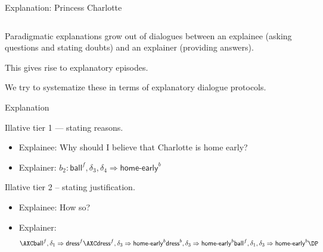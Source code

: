 \documentclass[aspectratio=169]{beamer}
\begin{document}
\begin{frame}[label={sec:org36535bb},fragile]{Explanation: Princess Charlotte}
\begin{columns}
\begin{column}{.6\columnwidth}
\begin{center}
\end{center}
\end{column}
\end{columns}
\end{frame}
\begin{frame}[label={sec:org540a8bb},standout]{}
Paradigmatic explanations grow out of dialogues between an \alert{explainee} (asking questions and stating doubts) and an \alert{explainer} (providing answers). \pause

This gives rise to \alert{explanatory episodes}. \pause

We try to systematize these in terms of \alert{explanatory dialogue protocols}. 
\end{frame}

\begin{frame}[label={sec:orgf702943}]{Explanation}
\begin{bbox}
\alert{Illative tier 1} --- stating reasons.
\begin{itemize}
\item Explainee: Why should I believe that Charlotte is home early? \pause
\item Explainer: \(b_2: \mathsf{ball}^f, \delta_3, \delta_4 \Rightarrow \mathsf{home}\mbox{-}\mathsf{early}^b\)
\end{itemize}
\end{bbox}
\pause

\begin{bbox}
\alert{Illative tier 2} -- stating justification.
\begin{itemize}
\item Explainee: How so? \pause
\item Explainer:
\[
  \axs{\mathsf{ball}^f, \delta_1 \Rightarrow \mathsf{dress}^f}
  \axs{\mathsf{dress}^f, \delta_3 \Rightarrow \mathsf{home}\mbox{-}\mathsf{early}^b}
  \irl1{DDet}{\mathsf{dress}^b, \delta_3 \Rightarrow \mathsf{home}\mbox{-}\mathsf{early}^b}
  \irl2{Cut}{\mathsf{ball}^f, \delta_1, \delta_3 \Rightarrow \mathsf{home}\mbox{-}\mathsf{early}^b}
  \DP
   \]
\end{itemize}
\end{bbox}
\end{frame}
\end{document}
